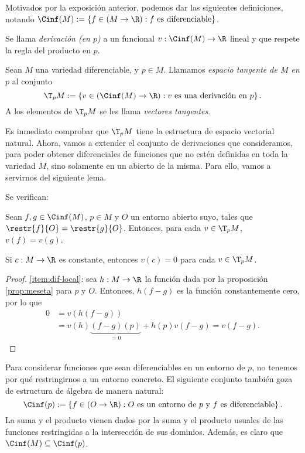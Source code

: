 Motivados por la exposición anterior, podemos dar las siguientes definiciones,
notando $\Cinf(M) := \left\{ f\in(M\to\R) : f\text{ es diferenciable} \right\}$.

\begin{ndef}[Derivación]
  Se llama \emph{derivación (en $p$)} a un funcional $v: \Cinf(M)\to\R$ lineal y que
  respete la regla del producto en $p$.
\end{ndef}

\begin{ndef}
  Sean $M$ una variedad diferenciable, y $p\in M$. Llamamos \emph{espacio
tangente de $M$ en $p$} al conjunto
  \[
    \T_{p}M := \left\{ v\in(\Cinf(M)\to\R) :
        v\text{ es una derivación en $p$}
\right\}
  .\]
A los elementos de $\T_{p}M$ se les llama \emph{vectores tangentes}.
\end{ndef}

Es inmediato comprobar que $\T_{p}M$ tiene la estructura de espacio vectorial
natural. Ahora, vamos a extender el conjunto de derivaciones que consideramos,
para poder obtener diferenciales de funciones que no estén definidas en toda la
variedad $M$, sino solamente en un abierto de la misma. Para ello, vamos a
servirnos del siguiente lema.
\begin{lema} \label{lema:derivacion-local}
  Se verifican:
  \begin{nlist}
  \item \label{item:dif-local}
    Sean $f,g\in\Cinf(M)$, $p\in M$ y $O$ un entorno abierto suyo, tales que
    $\restr{f}{O} = \restr{g}{O}$. Entonces, para cada $v\in \T_{p}M$, $v(f)=v(g)$.
  \item
    Si $c:M\to\R$ es constante, entonces $v(c) = 0$ para cada $v\in \T_{p}M$.
  \end{nlist}
\end{lema}
\begin{proof}
  \ref{item:dif-local}: sea $h: M\to\R$ la función dada por la proposición
  \ref{prop:meseta} para $p$ y $O$. Entonces, $h(f-g)$ es la función
  constantemente cero, por lo que
  \begin{align*}
    0 &= v(h(f-g)) \\
    & = v(h)\underbrace{(f-g)(p)}_{=0} + h(p)v(f-g) = v(f-g).
  \end{align*}
\end{proof}

Para considerar funciones que sean diferenciables en un entorno de $p$, no
tenemos por qué restringirnos a un entorno concreto. El siguiente conjunto
también goza de estructura de álgebra de manera natural:
\[
  \Cinf(p) := \left\{ f\in(O\to\R) : O\text{ es un entorno de $p$ y } f\text{ es diferenciable} \right\}
.\]
La suma y el producto vienen dados por la suma y el producto usuales de las
funciones restringidas a la intersección de sus dominios. Además, es claro que
$\Cinf(M)\subseteq\Cinf(p)$.

